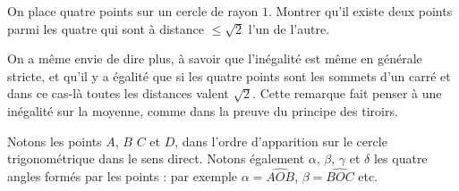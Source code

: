 \begin{exo}
On place quatre points sur un cercle de rayon $1$. Montrer qu'il existe deux points parmi les quatre qui sont à distance $\leq \sqrt{2}$ l'un de l'autre. 
\begin{hint}
On a même envie de dire plus, à savoir que l'inégalité est même en générale stricte, et qu'il y a égalité que si les quatre points sont les sommets d'un carré et dans ce cas-là toutes les distances valent $\sqrt2$. Cette remarque fait penser à une inégalité sur la moyenne, comme dans la preuve du principe des tiroirs.
\end{hint}

\begin{sol}


Notons les points $A$, $B$ $C$ et $D$, dans l'ordre d'apparition sur le cercle trigonométrique dans le sens direct. Notons également $\alpha$, $\beta$, $\gamma$ et $\delta$ les quatre angles formés par les points : par exemple $\alpha = \widehat{AOB}$, $\beta = \widehat{BOC}$ etc.


\end{sol}
\end{exo}
